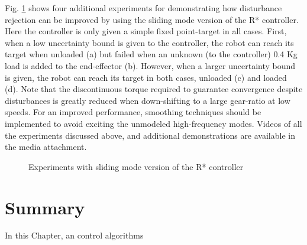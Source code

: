 Fig. \ref{fig:rob} shows four additional experiments for demonstrating how disturbance rejection can be improved by using the sliding mode version of the R* controller. Here the controller is only given a simple fixed point-target in all cases. First, when a low uncertainty bound is given to the controller, the robot can reach its target when unloaded (a) but failed when an unknown (to the controller) 0.4 Kg load is added to the end-effector (b). However, when a larger uncertainty bound is given, the robot can reach its target in both cases, unloaded (c) and loaded (d). Note that the discontinuous torque required to guarantee convergence despite disturbances is greatly reduced when down-shifting to a large gear-ratio at low speeds. For an improved performance, smoothing techniques should be implemented to avoid exciting the unmodeled high-frequency modes. Videos of all the experiments discussed above, and additional demonstrations are available in the media attachment.

\begin{figure}[htp]
        \centering
				\hspace{-10pt}
				\hspace{-5pt}
				\hspace{-5pt}
				\hspace{-5pt}
        \caption{Experiments with sliding mode version of the R* controller }
				\label{fig:rob}
\end{figure}





\section{Summary}

In this Chapter, an control algorithms 